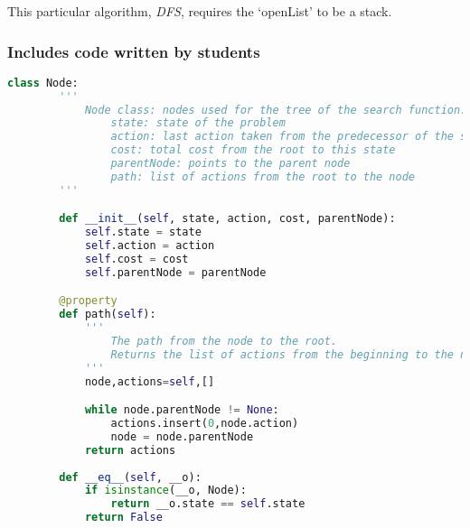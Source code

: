 \documentclass{article}
\begin{document}
This particular algorithm, \emph{DFS}, requires the `openList' to be a stack.

\subsubsection{Includes code written by students}

\begin{lstlisting}[language=python, caption = The Node class (\emph{search.py}),captionpos=t]
    class Node:
        '''
            Node class: nodes used for the tree of the search function.
                state: state of the problem
                action: last action taken from the predecessor of the state to get to this state
                cost: total cost from the root to this state
                parentNode: points to the parent node
                path: list of actions from the root to the node 
        '''

        def __init__(self, state, action, cost, parentNode):
            self.state = state
            self.action = action
            self.cost = cost
            self.parentNode = parentNode

        @property
        def path(self):
            '''
                The path from the node to the root.
                Returns the list of actions from the beginning to the node.
            '''
            node,actions=self,[]

            while node.parentNode != None:
                actions.insert(0,node.action)
                node = node.parentNode
            return actions
        
        def __eq__(self, __o):
            if isinstance(__o, Node):
                return __o.state == self.state
            return False
\end{lstlisting}
\end{document}
